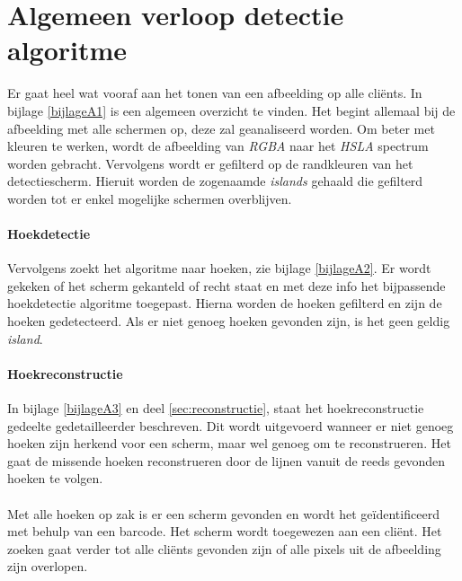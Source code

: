 \section{Algemeen verloop detectie algoritme}
Er gaat heel wat vooraf aan het tonen van een afbeelding op alle cliënts. In bijlage \ref{bijlageA1} is een algemeen overzicht te vinden.
Het begint allemaal bij de afbeelding met alle schermen op, deze zal geanaliseerd worden. Om beter met kleuren te werken, wordt de afbeelding van {\it RGBA} naar het {\it HSLA} spectrum worden gebracht. Vervolgens wordt er gefilterd op de randkleuren van het detectiescherm. Hieruit worden de zogenaamde {\it islands} gehaald die gefilterd worden tot er enkel mogelijke schermen overblijven.
\paragraph{Hoekdetectie}
Vervolgens zoekt het algoritme naar hoeken, zie bijlage \ref{bijlageA2}. Er wordt gekeken of het scherm gekanteld of recht staat en met deze info het bijpassende hoekdetectie algoritme toegepast. Hierna worden de hoeken gefilterd en zijn de hoeken gedetecteerd. Als er niet genoeg hoeken gevonden zijn, is het geen geldig {\it island}.

\paragraph{Hoekreconstructie}
In bijlage \ref{bijlageA3} en deel \ref{sec:reconstructie}, staat het hoekreconstructie gedeelte gedetailleerder beschreven. Dit wordt uitgevoerd wanneer er niet genoeg hoeken zijn herkend voor een scherm, maar wel genoeg om te reconstrueren. Het gaat de missende hoeken reconstrueren door de lijnen vanuit de reeds gevonden hoeken te volgen.
\paragraph{}
Met alle hoeken op zak is er een scherm gevonden en wordt het geïdentificeerd met behulp van een barcode. Het scherm wordt toegewezen aan een cliënt. Het zoeken gaat verder tot alle cliënts gevonden zijn of alle pixels uit de afbeelding zijn overlopen.


